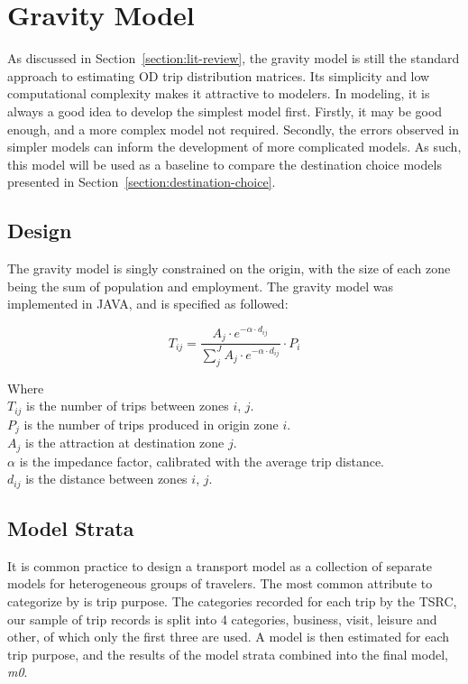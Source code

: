 \chapter{Gravity Model} 
\label{section:gravity-model}
As discussed in Section~\ref{section:lit-review}, the gravity model is still the standard approach to estimating OD trip distribution matrices. Its simplicity and low computational complexity makes it attractive to modelers. In modeling, it is always a good idea to develop the simplest model first. Firstly, it may be good enough, and a more complex model not required. Secondly, the errors observed in simpler models can inform the development of more complicated models. As such, this model will be used as a baseline to compare the destination choice models presented in Section~\ref{section:destination-choice}.

\section{Design}
The gravity model is singly constrained on the origin, with the size of each zone being the sum of population and employment. The gravity model was implemented in JAVA, and is specified as followed:

$$ 
T_{ij} = \frac{A_j \cdot e^{-\alpha \cdot d_{ij}}}{\sum_j^J A_j \cdot e^{-\alpha \cdot d_{ij}}} \cdot P_i $$

Where \\
$T_{ij}$ is the number of trips between zones $i$, $j$. \\
$P_j$ is the number of trips produced in origin zone $i$.\\
$A_j$ is the attraction at destination zone $j$.\\
$\alpha$ is the impedance factor, calibrated with the average trip distance.\\
$d_{ij}$ is the distance between zones $i$, $j$.\\

\section{Model Strata}
It is common practice to design a transport model as a collection of separate models for heterogeneous groups of travelers. The most common attribute to categorize by is trip purpose. The categories recorded for each trip by the TSRC, our sample of trip records is split into 4 categories, business, visit, leisure and other, of which only the first three are used. A model is then estimated for each trip purpose, and the results of the model strata combined into the final model, \textit{m0}. 


